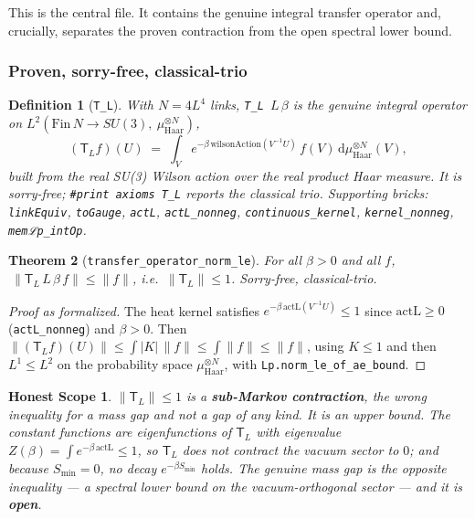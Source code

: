 \documentclass[11pt]{article}
\newtheorem{theorem}{Theorem}[section]
\newtheorem{definition}[theorem]{Definition}
\newtheorem*{honest}{Honest Scope}
\newcommand{\TL}{\mathsf{T}_L}
\newcommand{\haarN}{\mu_{\mathrm{Haar}}^{\otimes N}}
\newcommand{\code}[1]{\texttt{#1}}
\begin{document}
This is the central file. It contains the genuine integral transfer
operator and, crucially, separates the proven contraction from the
open spectral lower bound.

\subsubsection*{Proven, sorry-free, classical-trio}

\begin{definition}[\code{T\_L}]
With $N=4L^4$ links, \code{T\_L}\ $L\,\beta$ is the genuine integral
operator on $L^2(\mathrm{Fin}\,N\to SU(3),\ \haarN)$,
\[
  (\TL f)(U) \;=\; \int_V e^{-\beta\,\mathrm{wilsonAction}(V^{-1}U)}\, f(V)\,
  \mathrm{d}\haarN(V),
\]
built from the \emph{real} SU(3) Wilson action over the \emph{real}
product Haar measure. It is sorry-free; \code{\#print axioms T\_L}
reports the classical trio. Supporting bricks: \code{linkEquiv},
\code{toGauge}, \code{actL}, \code{actL\_nonneg},
\code{continuous\_kernel}, \code{kernel\_nonneg}, \code{memℒp\_intOp}.
\end{definition}

\begin{theorem}[\code{transfer\_operator\_norm\_le}]
For all $\beta>0$ and all $f$, $\ \lVert \TL\,L\,\beta\,f\rVert \le
\lVert f\rVert$, i.e.\ $\lVert\TL\rVert\le 1$. Sorry-free,
classical-trio.
\end{theorem}

\begin{proof}[Proof as formalized]
The heat kernel satisfies $e^{-\beta\,\mathrm{actL}(V^{-1}U)}\le 1$
since $\mathrm{actL}\ge 0$ (\code{actL\_nonneg}) and $\beta>0$. Then
$\lVert(\TL f)(U)\rVert \le \int \lvert K\rvert\,\lVert f\rVert \le
\int \lVert f\rVert \le \lVert f\rVert$, using $K\le 1$ and then
$L^1\le L^2$ on the probability space $\haarN$, with
\code{Lp.norm\_le\_of\_ae\_bound}.
\end{proof}

\begin{honest}
$\lVert\TL\rVert\le 1$ is a \textbf{sub-Markov contraction}, the wrong
inequality for a mass gap and not a gap of any kind. It is an
\emph{upper} bound. The constant functions are eigenfunctions of
$\TL$ with eigenvalue $Z(\beta)=\int e^{-\beta\,\mathrm{actL}}\le 1$,
so $\TL$ does \emph{not} contract the vacuum sector to $0$; and
because $S_{\min}=0$, no decay $e^{-\beta S_{\min}}$ holds. The
genuine mass gap is the \emph{opposite} inequality --- a spectral
\emph{lower} bound on the vacuum-orthogonal sector --- and it is
\textbf{open}.
\end{honest}
\end{document}

